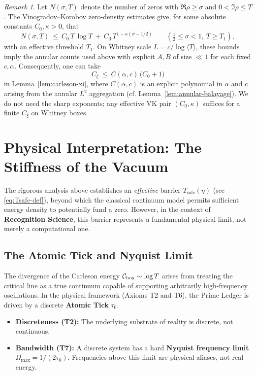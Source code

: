 \documentclass[11pt]{article}
\theoremstyle{definition}
\theoremstyle{remark}
\newtheorem{remark}[theorem]{Remark}
\theoremstyle{definition}
\begin{document}
\begin{remark}
Let $N(\sigma,T)$ denote the number of zeros with $\Re\rho\ge \sigma$ and $0<\Im\rho\le T$. The Vinogradov–Korobov zero-density estimates give, for some absolute constants $C_0,\kappa>0$, that
\[
  N(\sigma,T)\ \le\ C_0\,T\,\log T\ +\ C_0\,T^{1-\kappa(\sigma-1/2)}\qquad (\tfrac12\le \sigma<1,\ T\ge T_1),
\]
with an effective threshold $T_1$. On Whitney scale $L=c/\log\langle T\rangle$, these bounds imply the annular counts used above with explicit $A,B$ of size $\ll 1$ for each fixed $c,\alpha$. Consequently, one can take
\[
  C_\xi\ \le\ C(\alpha,c)\,\big(C_0+1\big)
\]
in Lemma~\ref{lem:carleson-xi}, where $C(\alpha,c)$ is an explicit polynomial in $\alpha$ and $c$ arising from the annular $L^2$ aggregation (cf. Lemma~\ref{lem:annular-balayage}). We do not need the sharp exponents; any effective VK pair $(C_0,\kappa)$ suffices for a finite $C_\xi$ on Whitney boxes.
\end{remark}

\section{Physical Interpretation: The Stiffness of the Vacuum}\label{sec:rs-interpretation}

The rigorous analysis above establishes an \emph{effective} barrier $T_{\text{safe}}(\eta)$ (see \eqref{eq:Tsafe-def}), beyond which the classical continuum model permits sufficient energy density to potentially fund a zero. However, in the context of \textbf{Recognition Science}, this barrier represents a fundamental physical limit, not merely a computational one.

\subsection{The Atomic Tick and Nyquist Limit}
The divergence of the Carleson energy $\mathcal{C}_{\rm box} \sim \log T$ arises from treating the critical line as a true continuum capable of supporting arbitrarily high-frequency oscillations.
In the physical framework (Axioms T2 and T6), the Prime Ledger is driven by a discrete \textbf{Atomic Tick} $\tau_0$.
\begin{itemize}
    \item \textbf{Discreteness (T2):} The underlying substrate of reality is discrete, not continuous.
    \item \textbf{Bandwidth (T7):} A discrete system has a hard \textbf{Nyquist frequency limit} $\Omega_{\max} = 1/(2\tau_0)$. Frequencies above this limit are physical aliases, not real energy.
\end{itemize}
\end{document}

